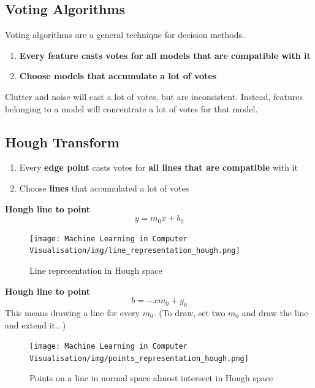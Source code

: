 \documentclass[x11names,11pt,a4paper]{article}
\theoremstyle{definition}
\begin{document}
\subsection{Voting Algorithms}
Voting algorithms are a general technique for decision methods.

\begin{enumerate}
	\item \textbf{Every feature casts votes for all models that are compatible with it}
	\item \textbf{Choose models that accumulate a lot of votes}
\end{enumerate}

Clutter and noise will cast a lot of votes, but are inconsistent. Instead, features belonging to a model will concentrate a lot of votes for that model.

\subsection{Hough Transform}
\begin{enumerate}
	\item Every \textbf{edge point} casts votes for \textbf{all lines that are compatible} with it
	\item Choose \textbf{lines} that accumulated a lot of votes
\end{enumerate}

\textbf{Hough line to point}
\begin{equation}
    y = m_0x+b_0
\end{equation}

\begin{figure}[H]
	\centering
	\texttt{[image: Machine Learning in Computer Visualisation/img/line\_representation\_hough.png]}
	\caption{Line representation in Hough space}
\end{figure}

\textbf{Hough line to point}
\begin{equation}
    b = -xm_0+y_0
\end{equation}
This means drawing a line for every $m_0$. (To draw, set two $m_0$ and draw the line and extend it...)

\begin{figure}[H]
	\centering
	\texttt{[image: Machine Learning in Computer Visualisation/img/points\_representation\_hough.png]}
	\caption{Points on a line in normal space almost intersect in Hough space}
	\label{fig:pointsrepresentationhough}
\end{figure}
\end{document}
